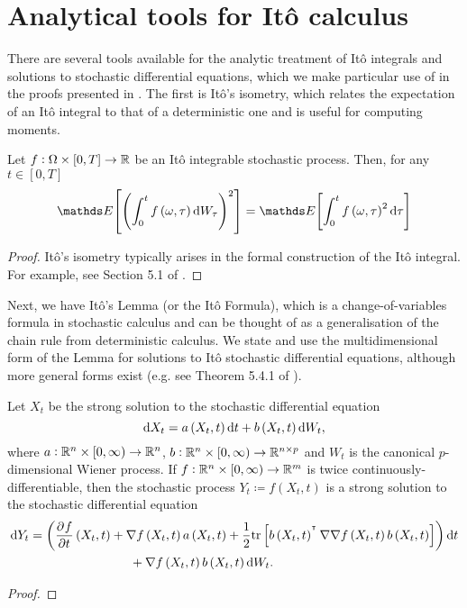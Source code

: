 \section{Analytical tools for It\^o calculus}\label{app:ito_tools}
There are several tools available for the analytic treatment of It\^o integrals and solutions to stochastic differential equations, which we make particular use of in the proofs presented in .
The first is It\^o's isometry, which relates the expectation of an It\^o integral to that of a deterministic one and is useful for computing moments.
\begin{theorem}[It\^o's Isometry]\label{thm:ito_isom}
	Let \(f: \Omega \times [0,T] \to \mathbb{R}\) be an It\^o integrable stochastic process.
	Then, for any \(t \in [0,T]\)
	\[
		\avg{\left(\int_0^t{f\left(\omega, \tau\right)\dif W_\tau}\right)^2} = \avg{\int_0^t{f\left(\omega, \tau\right)^2\dif\tau}}
	\]
\end{theorem}
\begin{proof}
	It\^o's isometry typically arises in the formal construction of the It\^o integral.
	For example, see Section 5.1 of \citet{KallianpurSundar_2014_StochasticAnalysisDiffusion}.
\end{proof}

Next, we have It\^o's Lemma (or the It\^o Formula), which is a change-of-variables formula in stochastic calculus and can be thought of as a generalisation of the chain rule from deterministic calculus.
We state and use the multidimensional form of the Lemma for solutions to It\^o stochastic differential equations, although more general forms exist (e.g. see Theorem 5.4.1 of \citet{KallianpurSundar_2014_StochasticAnalysisDiffusion}).
\begin{theorem}[It\^o's Lemma]\label{thm:ito_lemma}
	Let \(X_t\) be the strong solution to the stochastic differential equation
	\[
		\dif X_t = a\left(X_t, t\right)\dif t + b\left(X_t, t\right)\dif W_t,
	\]
	where \(a: \mathbb{R}^n \times [0,\infty) \to \mathbb{R}^n\), \(b: \mathbb{R}^n \times [0,\infty) \to \mathbb{R}^{n\times p}\) and \(W_t\) is the canonical \(p\)-dimensional Wiener process.
	If \(f: \mathbb{R}^n \times [0, \infty) \to \mathbb{R}^m\) is twice continuously-differentiable, then the stochastic process \(Y_t \coloneqq f\left(X_t, t\right)\) is a strong solution to the stochastic differential equation
	\begin{align*}
		\dif Y_t & = \left(\dpd{f}{t}\left(X_t, t\right) + \nabla f\left(X_t, t\right) a\left(X_t, t\right) + \frac12\mathrm{tr}\left[b\left(X_t, t\right)^{\T} \nabla\nabla f\left(X_t, t\right) b\left(X_t, t\right)\right] \right)\dif t \\
		         & \qquad\qquad\qquad\qquad + \nabla f\left(X_t, t\right)b\left(X_t, t\right) \dif W_t.
	\end{align*}
\end{theorem}
\begin{proof}

\end{proof}


